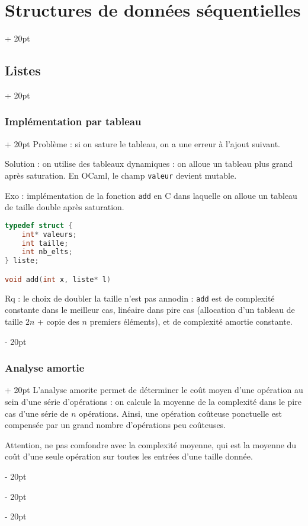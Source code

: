 \documentclass[a4paper, 12pt, twoside]{article}
\newcommand{\ind}[1][20pt]{\advance\leftskip + #1}
\newcommand{\deind}[1][20pt]{\advance\leftskip - #1}
\newenvironment{indt}[2][20pt]{#2 \par \ind[#1]}{\par \deind} %
\begin{document}
\begin{indt}{\section{Structures de données séquentielles}}
\begin{indt}{\subsection{Listes}}
\begin{indt}{\subsubsection{Implémentation par tableau}}
                Problème : si on sature le tableau, on a une erreur à l'ajout suivant.
                
                Solution : on utilise des tableaux dynamiques : on alloue un tableau plus grand après saturation.
                En OCaml, le champ \texttt{valeur} devient mutable.
                
                \vspace{6pt}
                
                Exo : implémentation de la fonction \texttt{add} en C dans laquelle on alloue un tableau de taille double après saturation.
                
                \newpage
                
                \begin{lstlisting}[language=C, xleftmargin=80pt]
typedef struct {
    int* valeurs;
    int taille;
    int nb_elts;
} liste;

void add(int x, liste* l)\end{lstlisting}
                
                Rq : le choix de doubler la taille n'est pas annodin : \texttt{add} est de complexité constante dans le meilleur cas, linéaire dans pire cas (allocation d'un tableau de taille $2n$ + copie des $n$ premiers éléments), et de complexité amortie constante.
            \end{indt}
            
            \vspace{6pt}
            
            \begin{indt}{\subsubsection{Analyse amortie}}
                L'analyse amorite permet de déterminer le coût moyen d'une opération au sein d'une série d'opérations : on calcule la moyenne de la complexité dans le pire cas d'une série de $n$ opérations. Ainsi, une opération coûteuse ponctuelle est compensée par un grand nombre d'opérations peu coûteuses.
                
                \vspace{6pt}
                
                Attention, ne pas comfondre avec la complexité moyenne, qui est la moyenne du coût d'une seule opération sur toutes les entrées d'une taille donnée.
                

\end{indt}
\end{indt}
\end{indt}
\end{document}
